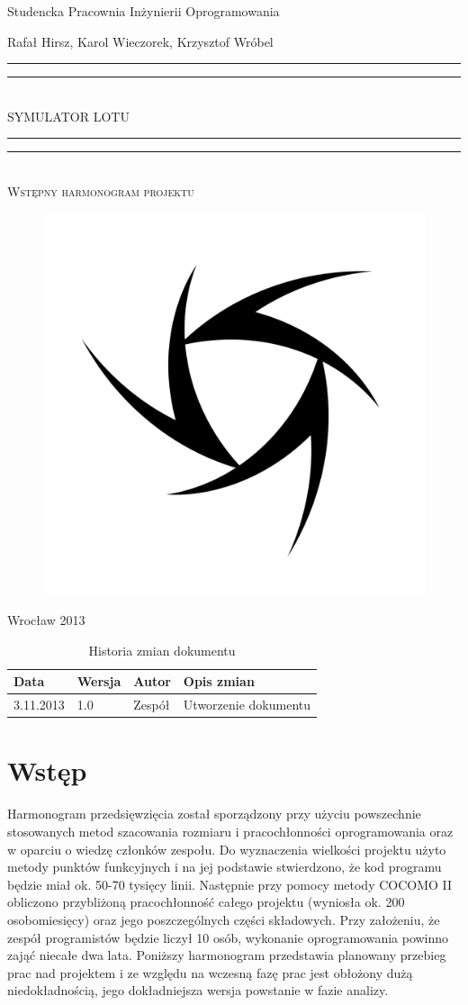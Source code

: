 \documentclass{mwrep}
\newcommand*{\titleGP}{\begingroup
\centering

{\Large Studencka Pracownia Inżynierii Oprogramowania}\par
\vspace*{16\baselineskip}

{\LARGE Rafał Hirsz, Karol Wieczorek, Krzysztof Wróbel\par}
\vspace*{\baselineskip}

\rule{\textwidth}{1.6pt}\vspace*{-\baselineskip}\vspace*{2pt}
\rule{\textwidth}{0.4pt}\\[\baselineskip]

{\Huge SYMULATOR LOTU}\\[0.2\baselineskip]

\rule{\textwidth}{0.4pt}\vspace*{-\baselineskip}\vspace{3.2pt}
\rule{\textwidth}{1.6pt}\\[\baselineskip]

\scshape
{\huge Wstępny harmonogram projektu}\par
\vspace*{2\baselineskip}

\begin{figure}[h]
\centering
\includegraphics[width=5\baselineskip]{flightsim-team-logo.pdf}
\end{figure}
\vfill

{\large Wrocław 2013}\par

\pagebreak

\endgroup}
\begin{document}
\thispagestyle{empty}
\titleGP

\begin{center}
\begin{table}[h]
\begin{center}
\begin{tabularx}{1\textwidth}{|l|l|l|X|}
\hline
Data & Wersja & Autor & Opis zmian \\ \hline
3.11.2013 & 1.0 & Zespół & Utworzenie dokumentu
\end{tabularx}
\end{center}
\vspace{3ex}
\caption{Historia zmian dokumentu}\label{T:Zmiany}
\end{table}
\end{center}

\pagebreak

\tableofcontents

\chapter{Wstęp}
Harmonogram przedsięwzięcia został sporządzony przy użyciu powszechnie stosowanych metod szacowania rozmiaru i pracochłonności oprogramowania oraz w oparciu o wiedzę członków zespołu. Do wyznaczenia wielkości projektu użyto metody punktów funkcyjnych i na jej podstawie stwierdzono, że kod programu będzie miał ok. 50-70 tysięcy linii. Następnie przy pomocy metody COCOMO II obliczono przybliżoną pracochłonność całego projektu (wyniosła ok. 200 osobomiesięcy) oraz jego poszczególnych części składowych. Przy założeniu, że zespół programistów będzie liczył 10 osób, wykonanie oprogramowania powinno zająć niecałe dwa lata.
Poniższy harmonogram przedstawia planowany przebieg prac nad projektem i ze względu na wczesną fazę prac jest obłożony dużą niedokładnością, jego dokładniejsza wersja powstanie w fazie analizy. 
\end{document}
